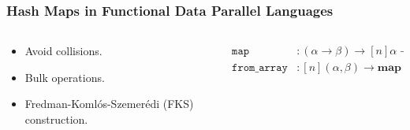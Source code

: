 \documentclass[aspectratio=169]{beamer}
\newcommand{\kw}[1]{\ensuremath{\mathtt{#1}}}
\newcommand{\Map}{\kw{map}}
\begin{document}
\begin{frame}\frametitle{Hash Maps in Functional Data Parallel Languages}
  \begin{columns}
  \begin{column}{.38\textwidth}
  \hfill
  \begin{itemize}
    \item Avoid collisions.
    \item Bulk operations.
    \item<2-> Fredman-Komlós-Szemerédi (FKS) construction. 
  \end{itemize}
  \hfill  
  \end{column}
  \hfill
  \begin{column}{.6\textwidth}
    \begin{align*}
      \Map & : (\alpha \to \beta) \to [n]\alpha \to [n]\beta \\
      \mathtt{from\_array} & : [n](\alpha, \beta) \to \mathbf{map} ~ \alpha ~ \beta
    \end{align*} 
  \end{column}
  \end{columns}
\end{frame}
\end{document}
